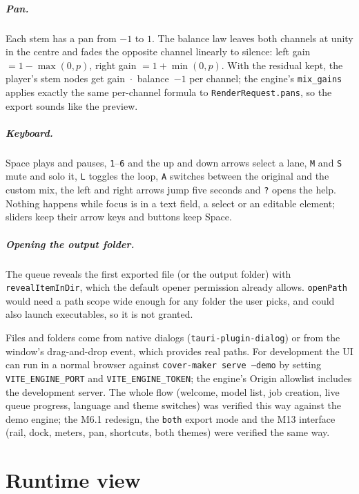 \documentclass{covermaker}
\begin{document}
\paragraph{Pan.} Each stem has a pan from $-1$ to $1$. The balance law leaves
both channels at unity in the centre and fades the opposite channel linearly to
silence: left gain $= 1 - \max(0, p)$, right gain $= 1 + \min(0, p)$. With
the residual kept, the player's stem nodes get gain~$\cdot$~balance~$-1$ per
channel; the engine's \texttt{mix\_gains} applies exactly the same per-channel
formula to \texttt{RenderRequest.pans}, so the export sounds like the preview.

\paragraph{Keyboard.} Space plays and pauses, \texttt{1}--\texttt{6} and the
up and down arrows select a lane, \texttt{M} and \texttt{S} mute and solo it,
\texttt{L} toggles the loop, \texttt{A} switches between the original and the
custom mix, the left and right arrows jump five seconds and \texttt{?} opens the
help. Nothing happens while focus is in a text field, a select or an editable
element; sliders keep their arrow keys and buttons keep Space.

\paragraph{Opening the output folder.} The queue reveals the first exported
file (or the output folder) with \texttt{revealItemInDir}, which the default
opener permission already allows. \texttt{openPath} would need a path scope
wide enough for any folder the user picks, and could also launch executables,
so it is not granted.

Files and folders come from native dialogs (\texttt{tauri-plugin-dialog}) or from
the window's drag-and-drop event, which provides real paths. For development the
UI can run in a normal browser against \texttt{cover-maker serve --demo} by
setting \texttt{VITE\_ENGINE\_PORT} and \texttt{VITE\_ENGINE\_TOKEN}; the
engine's Origin allowlist includes the development server. The whole flow
(welcome, model list, job creation, live queue progress, language and theme
switches) was verified this way against the demo engine; the M6.1 redesign,
the \texttt{both} export mode and the M13 interface (rail, dock, meters, pan,
shortcuts, both themes) were verified the same way.

\chapter{Runtime view}
\end{document}
